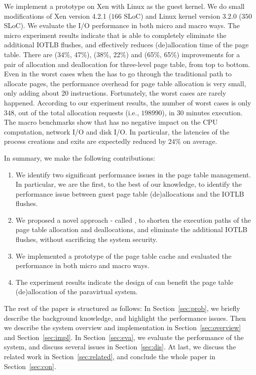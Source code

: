 We implement a prototype on Xen with Linux as the guest kernel. We do small modifications of Xen version 4.2.1 ($166$ SLoC) and Linux kernel version 3.2.0 ($350$ SLoC).
We evaluate the I/O performance in both micro and macro ways.
The micro experiment results indicate that \name is able to completely eliminate the additional IOTLB flushes, and effectively reduces (de)allocation time of the page table.
There are (34\%, 47\%), (38\%, 22\%) and (65\%, 65\%) improvements for a pair of allocation and deallocation for three-level page table, from top to bottom. 
Even in the worst cases when the \name has to go through the traditional path to allocate pages, the performance overhead for page table allocation is very small, only adding about 20 instructions. Fortunately, the worst cases are rarely happened. According to our experiment results, the number of worst cases is only $348$, out of the total allocation requests (i.e., $198990$), in 30 minutes execution.  
The macro benchmarks show that \name has no negative impact on the CPU computation, network I/O and disk I/O.
In particular, the latencies of the process creations and exits are expectedly reduced by 24\% on average.

In summary, we make the following contributions:
\begin{enumerate}
\item We identify two significant performance issues in the page table management. In particular, we are the first, to the best of our knowledge, to identify the performance issue between guest page table (de)allocations and the IOTLB flushes.
\item We proposed a novel approach - called \name, to shorten the execution paths of the page table allocation and deallocations, and eliminate the additional IOTLB flushes, without sacrificing the system security.
\item We implemented a prototype of the page table cache and evaluated the performance in both micro and macro ways.
\item The experiment results indicate the design of \name can benefit the page table (de)allocation of the paravirtual system.
\end{enumerate}

The rest of the paper is structured as follows: In Section~\ref{sec:prob}, we briefly describe the background knowledge, and highlight the performance issues. Then we describe the system overview and implementation in Section~\ref{sec:overview} and Section~\ref{sec:impl}. In Section~\ref{sec:eva}, we evaluate the performance of the \name system, and discuss several issues in Section~\ref{sec:dis}. At last, we discuss the related work in Section~\ref{sec:related}, and conclude the whole paper in Section~\ref{sec:con}.

